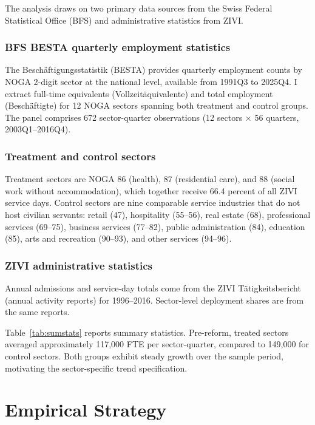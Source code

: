 \documentclass[12pt]{article}
\begin{document}
The analysis draws on two primary data sources from the Swiss Federal Statistical Office (BFS) and administrative statistics from ZIVI.

\subsubsection*{BFS BESTA quarterly employment statistics} The Beschäftigungsstatistik (BESTA) provides quarterly employment counts by NOGA 2-digit sector at the national level, available from 1991Q3 to 2025Q4. I extract full-time equivalents (Vollzeitäquivalente) and total employment (Beschäftigte) for 12 NOGA sectors spanning both treatment and control groups. The panel comprises 672 sector-quarter observations (12 sectors $\times$ 56 quarters, 2003Q1--2016Q4).

\subsubsection*{Treatment and control sectors} Treatment sectors are NOGA 86 (health), 87 (residential care), and 88 (social work without accommodation), which together receive 66.4 percent of all ZIVI service days. Control sectors are nine comparable service industries that do not host civilian servants: retail (47), hospitality (55--56), real estate (68), professional services (69--75), business services (77--82), public administration (84), education (85), arts and recreation (90--93), and other services (94--96).

\subsubsection*{ZIVI administrative statistics} Annual admissions and service-day totals come from the ZIVI Tätigkeitsbericht (annual activity reports) for 1996--2016. Sector-level deployment shares are from the same reports.

Table~\ref{tab:sumstats} reports summary statistics. Pre-reform, treated sectors averaged approximately 117,000 FTE per sector-quarter, compared to 149,000 for control sectors. Both groups exhibit steady growth over the sample period, motivating the sector-specific trend specification.




\section{Empirical Strategy}
\end{document}
